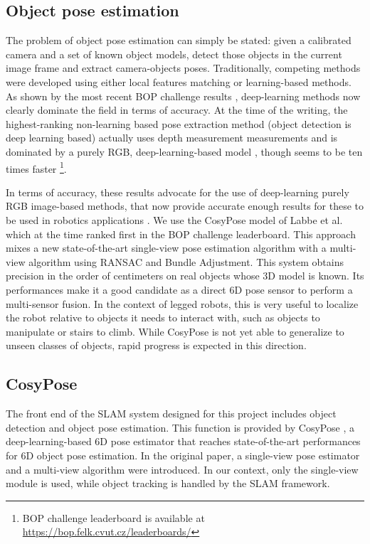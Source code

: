 \subsection{Object pose estimation}
\label{sec:object_pose_est_algos}
The problem of object pose estimation can simply be stated: given a calibrated camera and a set of known object models, detect those objects in the current image 
frame and extract camera-objects poses. Traditionally, competing methods were developed using either local features matching or learning-based methods.
As shown by the most recent BOP challenge results \cite{hodan2020bop}, deep-learning methods now clearly dominate the field in terms of accuracy. 
At the time of the writing, the highest-ranking non-learning based pose extraction method \cite{konig2020hybrid} (object detection is deep learning based) 
actually uses depth measurement measurements and is dominated by a purely RGB, deep-learning-based model \cite{haugaard2021surfemb}, though \cite{konig2020hybrid} 
seems to be ten times faster \footnote{BOP challenge leaderboard is available at \url{https://bop.felk.cvut.cz/leaderboards/}}.

In terms of accuracy, these results advocate for the use of deep-learning purely RGB image-based methods, that now provide accurate enough results 
for these to be used in robotics applications \cite{labbe2021single}. 
We use the CosyPose model of Labbe et al. \cite{labbe2020cosypose} which at the time ranked first in the BOP challenge leaderboard.
This approach mixes a new state-of-the-art single-view pose estimation algorithm with a multi-view algorithm using RANSAC and Bundle Adjustment. 
This system obtains precision in the order of centimeters 
on real objects whose 3D model is known. Its performances make it a good candidate as a direct 6D pose sensor to perform a multi-sensor fusion. 
In the context of legged robots, this is very useful to localize the robot relative to objects it needs to interact with, such as objects 
to manipulate or stairs to climb. While CosyPose is not yet able to generalize to unseen classes of objects, rapid progress is expected in 
this direction.

\subsection{CosyPose}
The front end of the SLAM system designed for this project includes object detection and object pose estimation. 
This function is provided by CosyPose \cite{labbe2020cosypose}, a deep-learning-based 6D pose estimator that reaches state-of-the-art
 performances for 6D object pose estimation.
In the original paper, a single-view pose estimator and a multi-view algorithm were introduced. In our context, only the single-view module is used, 
while object tracking is handled by the SLAM framework. 

